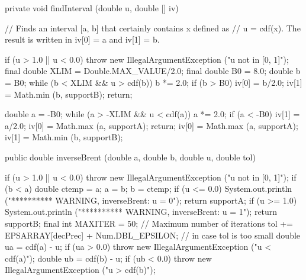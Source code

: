 \begin{code}\begin{hide}

   private void findInterval (double u, double [] iv) {
      // Finds an interval [a, b] that certainly contains x defined as
      // u = cdf(x). The result is written in iv[0] = a and iv[1] = b.

      if (u > 1.0 || u < 0.0)
         throw new IllegalArgumentException ("u not in [0, 1]");
      final double XLIM =  Double.MAX_VALUE/2.0;
      final double B0 = 8.0;
      double b = B0;
      while (b < XLIM && u > cdf(b))
         b *= 2.0;
      if (b > B0) {
         iv[0] = b/2.0;
         iv[1] = Math.min (b, supportB);
         return;
      }

      double a = -B0;
      while (a > -XLIM && u < cdf(a))
         a *= 2.0;
      if (a < -B0) {
         iv[1] = a/2.0;
         iv[0] = Math.max (a, supportA);
         return;
      }
      iv[0] = Math.max (a, supportA);
      iv[1] = Math.min (b, supportB);
   }\end{hide}

   public double inverseBrent (double a, double b, double u, double tol) \begin{hide} {
      if (u > 1.0 || u < 0.0)
          throw new IllegalArgumentException ("u not in [0, 1]");
      if (b < a) {
         double ctemp = a;   a = b;   b = ctemp;
      }
      if (u <= 0.0) {
          System.out.println ("********** WARNING,  inverseBrent:   u = 0");
          return supportA;
      }
      if (u >= 1.0) {
          System.out.println ("********** WARNING,  inverseBrent:   u = 1");
          return supportB;
      }
      final int MAXITER = 50;      // Maximum number of iterations
      tol += EPSARRAY[decPrec] + Num.DBL_EPSILON;    // in case tol is too small
      double ua = cdf(a) - u;
      if (ua > 0.0)
          throw new IllegalArgumentException ("u < cdf(a)");
      double ub = cdf(b) - u;
      if (ub < 0.0)
          throw new IllegalArgumentException ("u > cdf(b)");

}
\end{hide}
\end{code}
